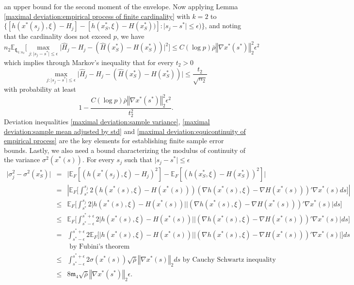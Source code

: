 \documentclass[mnsc,blindrev]{informs4} %
\newcommand{\norm}[1]{\left \Vert #1 \right\Vert}
\newcommand{\abs}[1]{\left \vert #1 \right\vert}
\begin{document}
an upper bound for the second moment of the envelope. Now applying Lemma \ref{maximal deviation:empirical process of finite cardinality} with $k=2$ to $\{[h(x^*(s_j),\xi)-H_j]-[h(x^*_S,\xi)-H(x^*_S))]:\lvert s_j-s^*\rvert\leq \epsilon)\}$, and noting that the cardinality does not exceed $p$, we have
\begin{equation*}
    n_2\mathbb E_{\bm{\xi}_{1:n_2}}\big[\max_{j:\lvert s_j-s^*\rvert\leq \epsilon}\big\lvert\hat H_j-H_j-(\hat H(x^*_S)-H(x^*_S))\big\rvert^2\big]\leq C(\log p) \bar{\rho}\norm{\nabla x^*(s^*)}_2^2\epsilon^2
\end{equation*}
which implies through Markov's inequality that for every $t_2>0$
\begin{equation}\label{maximal deviation:equicontinuity of empirical process}
    \max_{j:\lvert s_j-s^*\rvert\leq \epsilon}\big\lvert\hat H_j-H_j-(\hat H(x^*_S)-H(x^*_S))\big\rvert\leq \frac{t_2}{\sqrt{n_2}}
\end{equation}
with probability at least
\begin{equation*}
    1-\frac{C(\log p) \bar{\rho}\norm{\nabla x^*(s^*)}_2^2\epsilon^2}{t_2^2}.
\end{equation*}
Deviation inequalities \eqref{maximal deviation:sample variance}, \eqref{maximal deviation:sample mean adjusted by std} and \eqref{maximal deviation:equicontinuity of empirical process} are the key elements for establishing finite sample error bounds. Lastly, we also need a bound characterizing the modulus of continuity of the variance $\sigma^2(x^*(s))$. For every $s_j$ such that $\lvert s_j-s^*\rvert\leq \epsilon$
\begin{eqnarray*}
\lvert \sigma^2_j-\sigma^2(x^*_S)\rvert&=&\lvert\mathbb E_F[(h(x^*(s_j),\xi)-H_j)^2]-\mathbb E_F[(h(x^*_S,\xi)-H(x^*_S))^2] \rvert\\
&=&\abs{\mathbb E_F\big[ \int_{s^*}^{s_j}2(h(x^*(s),\xi)-H(x^*(s)))(\nabla h(x^*(s),\xi)-\nabla H(x^*(s)))'\nabla x^*(s)ds\big]}\\
&\leq &\mathbb E_F\big[ \int_{s^*}^{s_j}2\vert h(x^*(s),\xi)-H(x^*(s))\rvert \lvert(\nabla h(x^*(s),\xi)-\nabla H(x^*(s)))'\nabla x^*(s)\rvert ds\big]\\
&\leq &\mathbb E_F\big[ \int_{s^*-\epsilon}^{s^*+\epsilon}2\lvert h(x^*(s),\xi)-H(x^*(s))\rvert \lvert(\nabla h(x^*(s),\xi)-\nabla H(x^*(s)))'\nabla x^*(s)\rvert ds\big]\\
&=& \int_{s^*-\epsilon}^{s^*+\epsilon}2\mathbb E_F\big[\lvert h(x^*(s),\xi)-H(x^*(s))\rvert \lvert(\nabla h(x^*(s),\xi)-\nabla H(x^*(s)))'\nabla x^*(s)\rvert\big] ds\\
&&\text{\ \ \ by Fubini's theorem}\\
&\leq&\int_{s^*-\epsilon}^{s^*+\epsilon}2\sigma(x^*(s)) \sqrt{\bar{\rho}}\norm{\nabla x^*(s)}_2 ds\text{\ \ by Cauchy Schwartz inequality}\\
&\leq& 8\mathfrak{m}_4 \sqrt{\bar{\rho}}\norm{\nabla x^*(s^*)}_2\epsilon.
\end{eqnarray*}
\end{document}
